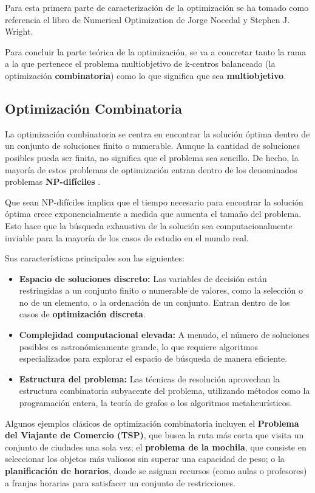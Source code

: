 \documentclass[12pt,a4paper]{book}
\begin{document}
Para esta primera parte de caracterización de la optimización se ha tomado como referencia el libro \cite{Numerical_optimization_nocedal_wright} de Numerical Optimization de Jorge Nocedal y Stephen J. Wright.

Para concluir la parte teórica de la optimización, se va a concretar tanto la rama a la que pertenece el problema multiobjetivo de k-centros balanceado (la optimización \textbf{combinatoria}) como lo que significa que sea \textbf{multiobjetivo}.

\subsection{Optimización Combinatoria}
La optimización combinatoria se centra en encontrar la solución óptima dentro de un conjunto de soluciones finito o numerable. Aunque la cantidad de soluciones posibles pueda ser finita, no significa que el problema sea sencillo.
De hecho, la mayoría de estos problemas de optimización entran dentro de los denominados problemas \textbf{NP-difíciles} \citep{np_hard}.

Que sean NP-difíciles implica que el tiempo necesario para encontrar la solución óptima crece exponencialmente a medida que aumenta el tamaño del problema. Esto hace que la búsqueda exhaustiva de la solución sea computacionalmente inviable para la mayoría de los casos de estudio en el mundo real.

Sus características principales son las siguientes:
\begin{itemize}
    \item \textbf{Espacio de soluciones discreto:} Las variables de decisión están restringidas a un conjunto finito o numerable de valores, como la selección o no de un elemento, o la ordenación de un conjunto. Entran dentro de los casos de \textbf{optimización discreta}. 
    \item \textbf{Complejidad computacional elevada:} A menudo, el número de soluciones posibles es astronómicamente grande, lo que requiere algoritmos especializados para explorar el espacio de búsqueda de manera eficiente.
    \item \textbf{Estructura del problema:} Las técnicas de resolución aprovechan la estructura combinatoria subyacente del problema, utilizando métodos como la programación entera, la teoría de grafos o los algoritmos metaheurísticos.
\end{itemize}

Algunos ejemplos clásicos de optimización combinatoria incluyen el \textbf{Problema del Viajante de Comercio (TSP)}, 
que busca la ruta más corta que visita un conjunto de ciudades una sola vez;
el \textbf{problema de la mochila}, que consiste en seleccionar los objetos más valiosos sin superar una capacidad de peso;
o la \textbf{planificación de horarios}, donde se asignan recursos (como aulas o profesores) a franjas horarias para satisfacer un conjunto de restricciones.
\end{document}
